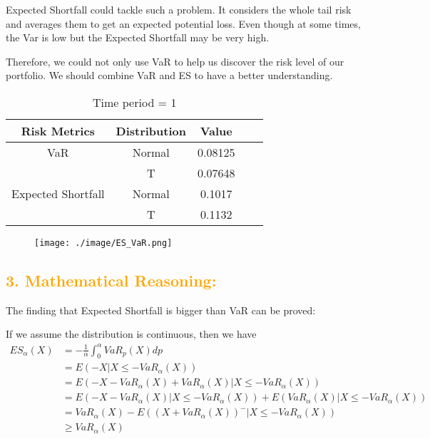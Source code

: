 \documentclass[11pt,en]{elegantpaper}
\begin{document}
Expected Shortfall could tackle such a problem. It considers the whole tail risk and averages them to get an expected potential loss. Even though at some times, the Var is low but the Expected Shortfall may be very high.

Therefore, we could not only use VaR to help us discover the risk level of our portfolio. We should combine VaR and ES to have a better understanding.

\begin{table}[htbp]
    \centering
    \caption{Time period = 1}
    \begin{tabular}{@{}ccccc@{}}
        \toprule
        \textbf{Risk Metrics} & \textbf{Distribution} & \textbf{Value}\\
        \midrule
        VaR & Normal  & 0.08125  \\
        & T  & 0.07648     \\
        Expected Shortfall & Normal  & 0.1017 \\
        & T & 0.1132 \\
        \bottomrule
    \end{tabular}
\end{table}

\begin{figure}[htbp] 
    \centering 
    \texttt{[image: ./image/ES\_VaR.png]} 
\end{figure}

\subsection*{\textcolor{orange}{3. Mathematical Reasoning:}}

The finding that Expected Shortfall is bigger than VaR can be proved:

If we assume the distribution is continuous, then we have 
\[
    \begin{aligned}
    ES_{\alpha}(X)&=-\frac{1}{\alpha}\int_{0}^{\alpha}VaR_p(X)dp\\
    &=E(-X|X\leq-VaR_\alpha(X))\\
    &=E(-X-VaR_\alpha(X)+VaR_\alpha(X)|X\leq-VaR_\alpha(X))\\
    &=E(-X-VaR_\alpha(X)|X\leq-VaR_\alpha(X))+E(VaR_\alpha(X)|X\leq-VaR_\alpha(X))\\
    &=VaR_\alpha(X)-E((X+VaR_\alpha(X))^{-}|X\leq-VaR_\alpha(X))\\
    &\geq VaR_\alpha(X)
    \end{aligned}
\]
\end{document}

